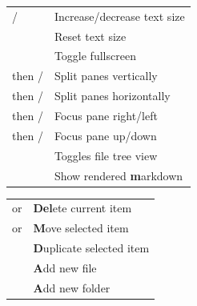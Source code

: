 \documentclass[a4paper]{article}
\newenvironment{keytable}[1]{%
  \begin{tabular}{|>{\rule{0pt}{0.85\normalbaselineskip}}l|l|}
  \hline
  \rowcolor[gray]{.8}
  \multicolumn{2}{|l|}{\bfseries #1}\\ \hline
}{%
  \end{tabular}\par\vspace{5mm}%
}
\begin{document}
\begin{center}
\begin{multicols*}{2}
\begin{keytable}{View}
\keys{Ctrl+Shift+{+}} / \keys{--}                          & Increase/decrease text size \\ \hline
\keys{Ctrl + 0}                                            & Reset text size \\ \hline
\keys{F11}                                                 & Toggle fullscreen \\ \hline
\keys{Ctrl + k} then \keys{down} / \keys{up}               & Split panes vertically  \\ \hline
\keys{Ctrl + k} then \keys{right} / \keys{left}            & Split panes horizontally \\ \hline
\keys{Ctrl + k} then \keys{Ctrl + right} / \keys{left}     & Focus pane right/left \\ \hline
\keys{Ctrl + k} then \keys{Ctrl + up} / \keys{down}        & Focus pane up/down \\ \hline
\keys{Ctrl + $\backslash$}                                 & Toggles file tree view\\ \hline
\keys{Ctrl+Shift+\textbf{m}}                               & Show rendered \textbf{m}arkdown \\ \hline
\end{keytable}

\begin{keytable}{Tree View}
\keys{\textbf{Del}} or \keys{Backspace}                    & \textbf{Del}ete current item \\ \hline
\keys{\textbf{m}} or \keys{F2}                             & \textbf{M}ove selected item \\ \hline
\keys{\textbf{d}}                                          & \textbf{D}uplicate selected item \\ \hline
\keys{\textbf{a}}                                          & \textbf{A}dd new file \\ \hline
\keys{Shift + \textbf{a}}                                  & \textbf{A}dd new folder \\ \hline
\end{keytable}


\end{multicols*}
\end{center}
\end{document}
